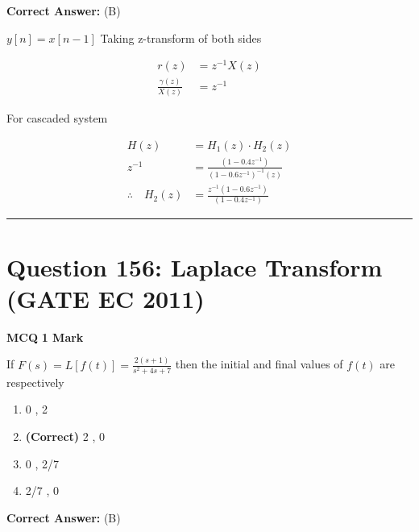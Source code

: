 \documentclass[11pt,a4paper]{article}
\begin{document}
\noindent \textbf{Correct Answer:} (B)

\begin{tcolorbox}[solbox, title=Detailed Solution -- Question 155]
$y[n]=x[n-1]$
 Taking z-transform of both sides

\[
\begin{aligned} r(z) &=z^{-1} X(z) \\ \frac{\gamma(z)}{X(z)} &=z^{-1} \end{aligned}
\]

 For cascaded system

\[
\begin{aligned} H(z)&=H_{1}(z) \cdot H_{2}(z)\\ z^{-1} &=\frac{\left(1-0.4 z^{-1}\right)}{\left(1-0.6 z^{-1}\right)^{-1}(z)} \\ \therefore \quad H_{2}(z) &=\frac{z^{-1}\left(1-0.6 z^{-1}\right)}{\left(1-0.4 z^{-1}\right)} \end{aligned}
\]
\end{tcolorbox}

\vspace{1.5em}
\hrule
\vspace{1.5em}

\section*{Question 156: Laplace Transform (GATE EC 2011)}
\noindent \textbf{\color{primary}MCQ} \hfill \textbf{\color{secondary}1 Mark}


\noindent If $F(s)=L[f(t)]=\frac{2(s+1)}{s^{2}+4s+7}$ then the initial and final values of $f(t)$ are respectively


\begin{enumerate}[label=(\Alph*)]
    \item 0 , 2
    \item \textbf{(Correct)} 2 , 0
    \item 0 , 2/7
    \item 2/7 , 0
\end{enumerate}

\noindent \textbf{Correct Answer:} (B)
\end{document}
